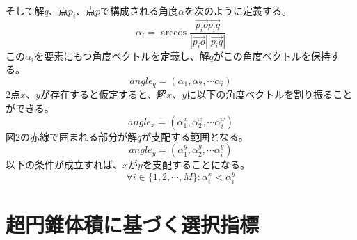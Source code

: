 \documentclass{rentai-chugoku}
\begin{document}
そして解$q$、点$p_{i}$、点$p$で構成される角度$\alpha$を次のように定義する。
\begin{equation}
\alpha_i=\arccos{\frac{\vec{p_{i}o} \vec{p_{i}q}}{|\vec{p_{i}o}| |\vec{p_{i}q}|}}
\end{equation}
この$\alpha_i$を要素にもつ角度ベクトルを定義し、解$q$がこの角度ベクトルを保持する。
\begin{equation}
angle_{q}=\left(\alpha_1,\alpha_2,\cdots \alpha_i \right)
\end{equation}
2点$x$、$y$が存在すると仮定すると、解$x$、$y$に以下の角度ベクトルを割り振ることができる。
\begin{equation}
angle_{x}=\left(\alpha^{x}_1,\alpha^{x}_2,\cdots \alpha^{x}_i \right)
\end{equation}
図2の赤線で囲まれる部分が解$q$が支配する範囲となる。
\begin{equation}
angle_{y}=\left(\alpha^{y}_1,\alpha^{y}_2,\cdots \alpha^{y}_i \right)
\end{equation}
以下の条件が成立すれば、$x$が$y$を支配することになる。
\begin{equation}
\forall i \in {\{1,2, \cdots,M}\}:\alpha^{x}_{i}< \alpha^{y}_{i}
\end{equation}


\section{超円錐体積に基づく選択指標}
\end{document}
